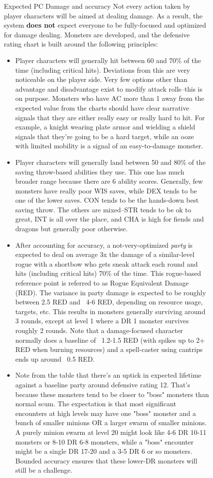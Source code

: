 \begin{figure}
	\begin{DndComment}{Expected PC Damage and accuracy}
		Not every action taken by player characters will be aimed at dealing damage. As a result, the system \textbf{does not} expect everyone to be fully-focused and optimized for damage dealing. Monsters are developed, and the defensive rating chart is built around the following principles:
		\begin{itemize}
			\item Player characters will generally hit between 60 and 70\% of the time (including critical hits). Deviations from this are very noticeable on the player side. Very few options other than advantage and disadvantage exist to modify attack rolls--this is on purpose. Monsters who have AC more than 1 away from the expected value from the charts should have clear narrative signals that they are either really easy or really hard to hit. For example, a knight wearing plate armor and wielding a shield signals that they're going to be a hard target, while an ooze with limited mobility is a signal of an easy-to-damage monster.
			\item Player characters will generally land between 50 and 80\% of the saving throw-based abilities they use. This one has much broader range because there are 6 ability scores. Generally, few monsters have really poor WIS saves, while DEX tends to be one of the lower saves. CON tends to be the hands-down best saving throw. The others are mixed--STR tends to be ok to great, INT is all over the place, and CHA is high for fiends and dragons but generally poor otherwise.
			\item After accounting for accuracy, a not-very-optimized \textit{party} is expected to deal on average 3x the damage of a similar-level rogue with a shortbow who gets sneak attack each round and hits (including critical hits) 70\% of the time. This rogue-based reference point is referred to as Rogue Equivalent Damage (RED). The variance in party damage is expected to be roughly between 2.5 RED and ~4-6 RED, depending on resource usage, targets, etc. This results in monsters generally surviving around 3 rounds, except at level 1 where a DR 1 monster survives roughly 2 rounds. Note that a damage-focused character normally does a baseline of ~1.2-1.5 RED (with spikes up to 2+ RED when burning resources) and a spell-caster using cantrips ends up around ~0.5 RED.
			\item Note from the table that there's an uptick in expected lifetime against a baseline party around defensive rating 12. That's because these monsters tend to be closer to "boss" monsters than normal scum. The expectation is that most significant encounters at high levels may have one "boss" monster and a bunch of smaller minions OR a larger swarm of smaller minions. A purely minion swarm at level 20 might look like 4-6 DR 10-11 monsters or 8-10 DR 6-8 monsters, while a "boss" encounter might be a single DR 17-20 and a 3-5 DR 6 or so monsters. Bounded accuracy ensures that these lower-DR monsters will still be a challenge.
		\end{itemize}
	\end{DndComment}
\end{figure}

